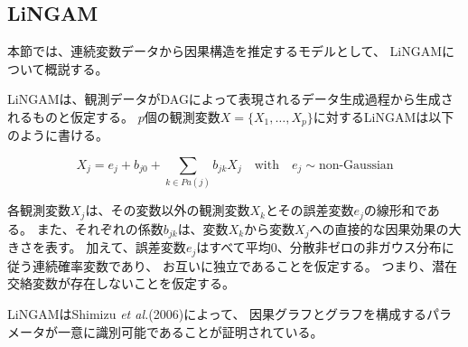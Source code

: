 
\subsection{LiNGAM}

本節では、連続変数データから因果構造を推定するモデルとして、
LiNGAM\cite{Shimizu2006-yu}について概説する。

LiNGAMは、観測データがDAGによって表現されるデータ生成過程から生成されるものと仮定する。
$p$個の観測変数$X = \{X_1, \dots, X_p \}$に対するLiNGAMは以下のように書ける。

\begin{equation}
  X_j = e_j + b_{j0} + \sum_{k \in Pa(j)} b_{jk}X_j
  \quad \text{with} \quad e_j \sim \text{non-Gaussian}
  \label{eq:lingam}
\end{equation}

各観測変数$X_j$は、その変数以外の観測変数$X_k$とその誤差変数$e_j$の線形和である。
また、それぞれの係数$b_{jk}$は、変数$X_k$から変数$X_j$への直接的な因果効果の大きさを表す。
加えて、誤差変数$e_j$はすべて平均0、分散非ゼロの非ガウス分布に従う連続確率変数であり、
お互いに独立であることを仮定する。
つまり、潜在交絡変数が存在しないことを仮定する\cite{Spirtes2000-mf}。

LiNGAMはShimizu \textit{et al.}(2006)\cite{Shimizu2006-yu}によって、
因果グラフとグラフを構成するパラメータが一意に識別可能であることが証明されている。
